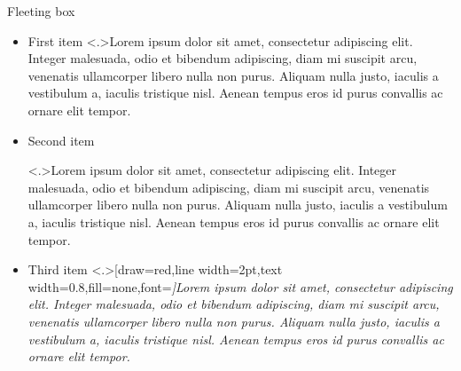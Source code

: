 \documentclass[10pt]{beamer}
\begin{document}
\begin{frame}{Fleeting box}


\begin{itemize}
\item<+-> First item
\fleetingbox<.>{Lorem ipsum dolor sit amet, consectetur adipiscing elit. Integer malesuada, odio et bibendum adipiscing, diam mi suscipit arcu, venenatis ullamcorper libero nulla non purus. Aliquam nulla justo, iaculis a vestibulum a, iaculis tristique nisl. Aenean tempus eros id purus convallis ac ornare elit tempor.}

\item<+-> Second item
{
\fleetingbox<.>{Lorem ipsum dolor sit amet, consectetur adipiscing elit. Integer malesuada, odio et bibendum adipiscing, diam mi suscipit arcu, venenatis ullamcorper libero nulla non purus. Aliquam nulla justo, iaculis a vestibulum a, iaculis tristique nisl. Aenean tempus eros id purus convallis ac ornare elit tempor.}

}%

\item<+-> Third item
\fleetingbox<.>[draw=red,line width=2pt,text width=0.8\linewidth,fill=none,font=\small\slshape]{Lorem ipsum dolor sit amet, consectetur adipiscing elit. Integer malesuada, odio et bibendum adipiscing, diam mi suscipit arcu, venenatis ullamcorper libero nulla non purus. Aliquam nulla justo, iaculis a vestibulum a, iaculis tristique nisl. Aenean tempus eros id purus convallis ac ornare elit tempor.}
\end{itemize}


\end{frame}
\end{document}
